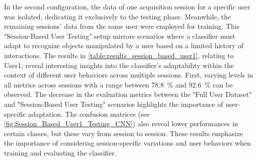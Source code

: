     \label{fig:conf_matrix_examplesC}

In the second configuration, the data of one acquisition session for a specific user was isolated, dedicating it exclusively to the testing phase. Meanwhile, the remaining sessions' data from the same user were employed for training. This "Session-Based User Testing" setup mirrors scenarios where a classifier must adapt to recognize objects manipulated by a user based on a limited history of interactions. The results in \autoref{table:results_session_based_user1}, relating to User1, reveal interesting insights into the classifier's adaptability within the context of different user behaviors across multiple sessions. First, varying levels in all metrics across sessions with a range between \SI{78.8}{\percent} and \SI{92.6}{\percent} can be observed. The decrease in the evaluation metrics between the "Full User Dataset" and "Session-Based User Testing" scenarios highlights the importance of user-specific adaptation. The confusion matrices (see \autoref{fig:Session_Based_User1_Testing_CNN}) also reveal lower performances in certain classes, but these vary from session to session. These results emphasize the importance of considering session-specific variations and user behaviors when training and evaluating the classifier. 

